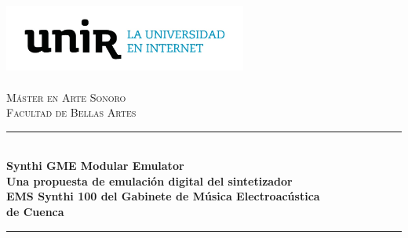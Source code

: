\begin{titlepage}

\newcommand{\HRule}{\rule{\linewidth}{0.5mm}} %

\center %


\includegraphics[width=0.6\textwidth]{./portada/logo}\\[1cm] %
 

\\[1cm] %
\textsc{\Large Máster en Arte Sonoro}\\[0.5cm] %
\textsc{\large Facultad de Bellas Artes}\\[0.0cm] %


\HRule \\[0.0cm]
{ \Large \bfseries Synthi GME Modular Emulator\\ \vspace{0.4cm} \normalsize Una propuesta de emulación digital del sintetizador\\ EMS Synthi 100 del Gabinete de Música Electroacústica\\de Cuenca}\\[0.1cm] %
\HRule \\[0.3cm]
 


\end{titlepage}
